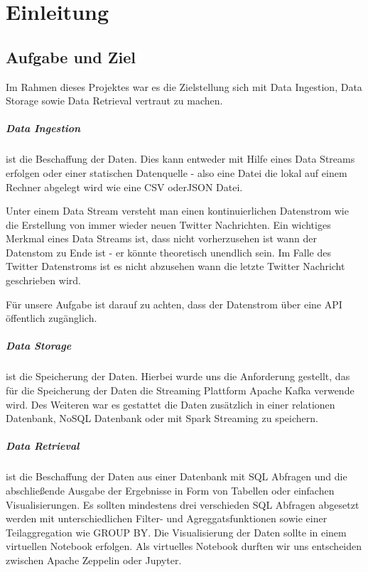 \chapter{Einleitung}
\label{chap:einleitung}

\section{Aufgabe und Ziel}
Im Rahmen dieses Projektes war es die Zielstellung sich mit Data Ingestion, Data Storage sowie Data Retrieval vertraut zu machen.
\paragraph{Data Ingestion} ist die Beschaffung der Daten.
Dies kann entweder mit Hilfe eines Data Streams erfolgen oder einer statischen Datenquelle - also eine Datei die lokal
auf einem Rechner abgelegt wird wie \zb{} eine \ac{CSV} oder\ac{JSON} Datei.

Unter einem Data Stream versteht man einen kontinuierlichen Datenstrom wie \zb{}
die Erstellung von immer wieder neuen Twitter Nachrichten.
Ein wichtiges Merkmal eines Data Streams ist, dass nicht vorherzusehen ist wann der Datenstom zu Ende ist - er könnte theoretisch unendlich sein.
Im Falle des Twitter Datenstroms ist es nicht abzusehen wann die letzte Twitter Nachricht geschrieben wird.

Für unsere Aufgabe ist darauf zu achten, dass der Datenstrom über eine \ac{API} öffentlich zugänglich.

\paragraph{Data Storage} ist die Speicherung der Daten.
Hierbei wurde uns die Anforderung gestellt, das für die Speicherung der Daten die Streaming Plattform Apache Kafka verwende wird.
Des Weiteren war es gestattet die Daten zusätzlich in einer relationen Datenbank, NoSQL Datenbank oder mit Spark Streaming zu speichern.

\paragraph{Data Retrieval} ist die Beschaffung der Daten aus einer Datenbank mit \ac{SQL} Abfragen und die abschließende Ausgabe
der Ergebnisse in Form von Tabellen oder einfachen Visualisierungen.
Es sollten mindestens drei verschieden \ac{SQL} Abfragen abgesetzt werden mit unterschiedlichen Filter- und Agreggatsfunktionen sowie einer Teilaggregation wie \zb{} GROUP BY.
Die Visualisierung der Daten sollte in einem virtuellen Notebook erfolgen.
Als virtuelles Notebook durften wir uns entscheiden zwischen Apache Zeppelin oder Jupyter.


